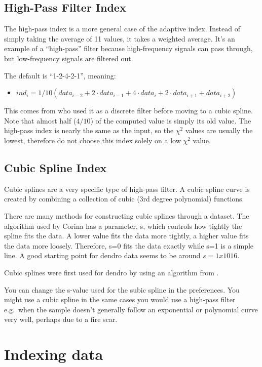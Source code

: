\subsection{High-Pass Filter Index}
The high-pass index is a more general case of the adaptive index. Instead of simply taking the average of 11 values, it takes a weighted average. It's an example of a ``high-pass'' filter because high-frequency signals can pass through, but low-frequency signals are filtered out.

The default is ``1-2-4-2-1'', meaning:

\begin{itemize}
\item $ind_{i} = 1/10 (data_{i-2} + 2{\cdotp}data_{i-1} + 4{\cdotp}data_{i} +2{\cdotp}data_{i+1} + data_{i+2})$ 
\end{itemize}

This comes from \citet{Cook81} who used it as a discrete filter before moving to a cubic spline. Note that almost half ($4/10$) of the computed value is simply its old value. The high-pass index is nearly the same as the input, so the $\chi^2$ values are usually the lowest, therefore do not choose this index solely on a low $\chi^2$ value. 

\subsection{Cubic Spline Index}
Cubic splines are a very specific type of high-pass filter. A cubic spline curve is created by combining a collection of cubic (3rd degree polynomial) functions.

There are many methods for constructing cubic splines through a dataset. The algorithm used by Corina has a parameter, s, which controls how tightly the spline fits the data. A lower value fits the data more tightly, a higher value fits the data more loosely. Therefore, s=0 fits the data exactly while s=1 is a simple line. A good starting point for dendro data seems to be around $s=1x1016$.

Cubic splines were first used for dendro by \citet{Cook81} using an algorithm from \citet{Reinsch67}.

You can change the s-value used for the subic spline in the preferences. You might use a cubic spline in the same cases you would use a high-pass filter e.g.\ when the sample doesn't generally follow an exponential or polynomial curve very well, perhaps due to a fire scar. 

\section{Indexing data}


